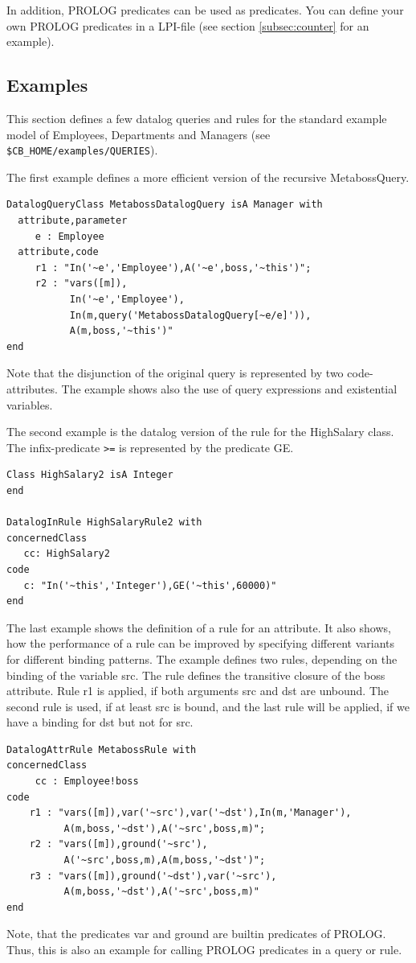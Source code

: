 In addition, PROLOG predicates can be used as predicates. You can define your own PROLOG
predicates in a LPI-file (see section \ref{subsec:counter} for an example).

\subsection{Examples}

This section defines a few datalog queries and rules for the standard example model
of Employees, Departments and Managers (see \verb+$CB_HOME/examples/QUERIES+).

The first example defines a more efficient version of the recursive {\ttfamily MetabossQuery}.

\begin{verbatim}
DatalogQueryClass MetabossDatalogQuery isA Manager with
  attribute,parameter
     e : Employee
  attribute,code
     r1 : "In('~e','Employee'),A('~e',boss,'~this')";
     r2 : "vars([m]),
           In('~e','Employee'),
           In(m,query('MetabossDatalogQuery[~e/e]')),
           A(m,boss,'~this')"
end
\end{verbatim}

Note that the disjunction of the original query is represented by two code-attributes.
The example shows also the use of query expressions and existential variables.

The second example is the datalog version of the rule for the HighSalary class.
The infix-predicate \verb+>=+ is represented by the predicate {\ttfamily GE}.

\begin{verbatim}
Class HighSalary2 isA Integer
end

DatalogInRule HighSalaryRule2 with
concernedClass
   cc: HighSalary2
code
   c: "In('~this','Integer'),GE('~this',60000)"
end
\end{verbatim}


The last example shows the definition of a rule for an attribute. It also
shows, how the performance of a rule can be improved by specifying different
variants for different binding patterns. The example defines two rules,
depending on the binding of the variable {\ttfamily src}. The rule
defines the transitive closure of the {\ttfamily boss} attribute.
Rule {\ttfamily r1} is applied, if both arguments {\ttfamily src}
and {\ttfamily dst} are unbound. The second rule is used, if at least {\ttfamily src}
is bound, and the last rule will be applied, if we have a binding
for  {\ttfamily dst} but not for {\ttfamily src}.

\begin{verbatim}
DatalogAttrRule MetabossRule with
concernedClass
     cc : Employee!boss
code
    r1 : "vars([m]),var('~src'),var('~dst'),In(m,'Manager'),
          A(m,boss,'~dst'),A('~src',boss,m)";
    r2 : "vars([m]),ground('~src'),
          A('~src',boss,m),A(m,boss,'~dst')";
    r3 : "vars([m]),ground('~dst'),var('~src'),
          A(m,boss,'~dst'),A('~src',boss,m)"
end
\end{verbatim}

Note, that the predicates {\ttfamily var} and {\ttfamily ground}
are builtin predicates of PROLOG. Thus, this is also an example
for calling PROLOG predicates in a query or rule.
